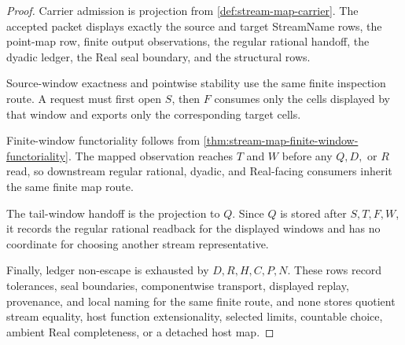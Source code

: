 \begin{proof}
Carrier admission is projection from \autoref{def:stream-map-carrier}. The accepted packet displays exactly the source and target StreamName rows, the point-map row, finite output observations, the regular rational handoff, the dyadic ledger, the Real seal boundary, and the structural rows.

Source-window exactness and pointwise stability use the same finite inspection route. A request must first open $S$, then $F$ consumes only the cells displayed by that window and exports only the corresponding target cells.

Finite-window functoriality follows from \autoref{thm:stream-map-finite-window-functoriality}. The mapped observation reaches $T$ and $W$ before any $Q,D,$ or $R$ read, so downstream regular rational, dyadic, and Real-facing consumers inherit the same finite map route.

The tail-window handoff is the projection to $Q$. Since $Q$ is stored after $S,T,F,W$, it records the regular rational readback for the displayed windows and has no coordinate for choosing another stream representative.

Finally, ledger non-escape is exhausted by $D,R,H,C,P,N$. These rows record tolerances, seal boundaries, componentwise transport, displayed replay, provenance, and local naming for the same finite route, and none stores quotient stream equality, host function extensionality, selected limits, countable choice, ambient Real completeness, or a detached host map.
\end{proof}

